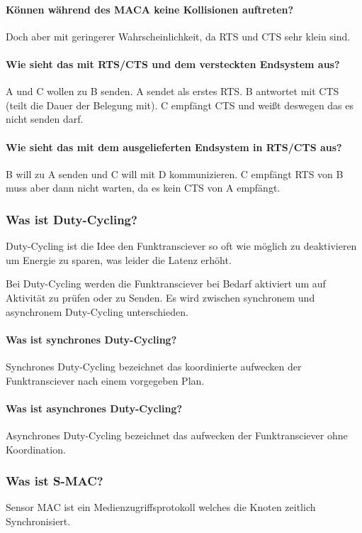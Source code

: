 	\paragraph{Können während des MACA keine Kollisionen auftreten?}
	Doch aber mit geringerer Wahrscheinlichkeit, da RTS und CTS sehr klein sind.
	
	\paragraph{Wie sieht das mit RTS/CTS und dem versteckten Endsystem aus?}
	A und C wollen zu B senden. A sendet als erstes RTS. B antwortet mit CTS (teilt die Dauer der Belegung mit). C empfängt CTS und weißt deswegen das es nicht senden darf.
	
	\paragraph{Wie sieht das mit dem ausgelieferten Endsystem in RTS/CTS aus?}
	B will zu A senden und C will mit D kommunizieren. C empfängt RTS von B muss aber dann nicht warten, da es kein CTS von A empfängt.
	
	\subsubsection{Was ist Duty-Cycling?}
	Duty-Cycling ist die Idee den Funktransciever so oft wie möglich zu deaktivieren um Energie zu sparen, was leider die Latenz erhöht.
	
	Bei Duty-Cycling werden die Funktransciever bei Bedarf aktiviert um auf Aktivität zu prüfen oder zu Senden.
	Es wird zwischen synchronem und asynchronem Duty-Cycling unterschieden.
	\paragraph{Was ist synchrones Duty-Cycling?}
	Synchrones Duty-Cycling bezeichnet das koordinierte aufwecken der Funktransciever nach einem vorgegeben Plan.
	\paragraph{Was ist asynchrones Duty-Cycling?}
	Asynchrones Duty-Cycling bezeichnet das aufwecken der Funktransciever ohne Koordination.
	
	\subsubsection{Was ist S-MAC?}
	Sensor MAC ist ein Medienzugriffsprotokoll welches die Knoten zeitlich Synchronisiert.
